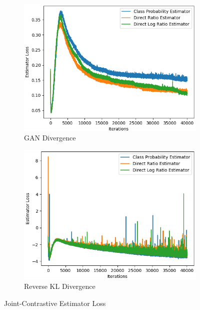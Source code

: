 \documentclass[honours,12pt]{unswthesis}
\numberwithin{equation}{section}
\theoremstyle{definition}
\begin{document}
\begin{figure}
\begin{subfigure}{0.49\textwidth}
\includegraphics[width=\linewidth]{estimator_losses/JCADVvsJCADVexpvsJCADVgudlog.png}
\caption{GAN Divergence}
\end{subfigure}
\begin{subfigure}{0.49\textwidth}
\includegraphics[width=\linewidth]{estimator_losses/JCKLDvsJCKLexpvsJCKLgudlog.png}
\caption{Reverse KL Divergence}
\end{subfigure}
\caption{Joint-Contrastive Estimator Loss}
\end{figure}
\end{document}
